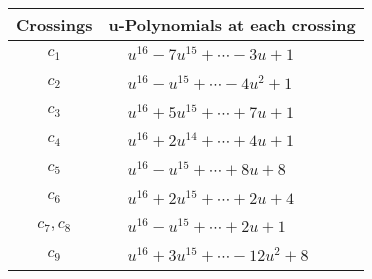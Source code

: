 \documentclass[1p]{elsarticle_modified}
\theoremstyle{definition}
\begin{document}
\begin{tabular}{m{50pt}|m{274pt}}
Crossings & \hspace{64pt}u-Polynomials at each crossing \\
\hline $$\begin{aligned}c_{1}\end{aligned}$$&$\begin{aligned}
&u^{16}-7 u^{15}+\cdots-3 u+1
\end{aligned}$\\
\hline $$\begin{aligned}c_{2}\end{aligned}$$&$\begin{aligned}
&u^{16}- u^{15}+\cdots-4 u^2+1
\end{aligned}$\\
\hline $$\begin{aligned}c_{3}\end{aligned}$$&$\begin{aligned}
&u^{16}+5 u^{15}+\cdots+7 u+1
\end{aligned}$\\
\hline $$\begin{aligned}c_{4}\end{aligned}$$&$\begin{aligned}
&u^{16}+2 u^{14}+\cdots+4 u+1
\end{aligned}$\\
\hline $$\begin{aligned}c_{5}\end{aligned}$$&$\begin{aligned}
&u^{16}- u^{15}+\cdots+8 u+8
\end{aligned}$\\
\hline $$\begin{aligned}c_{6}\end{aligned}$$&$\begin{aligned}
&u^{16}+2 u^{15}+\cdots+2 u+4
\end{aligned}$\\
\hline $$\begin{aligned}c_{7},c_{8}\end{aligned}$$&$\begin{aligned}
&u^{16}- u^{15}+\cdots+2 u+1
\end{aligned}$\\
\hline $$\begin{aligned}c_{9}\end{aligned}$$&$\begin{aligned}
&u^{16}+3 u^{15}+\cdots-12 u^2+8
\end{aligned}$\\

\end{tabular}
\end{document}
